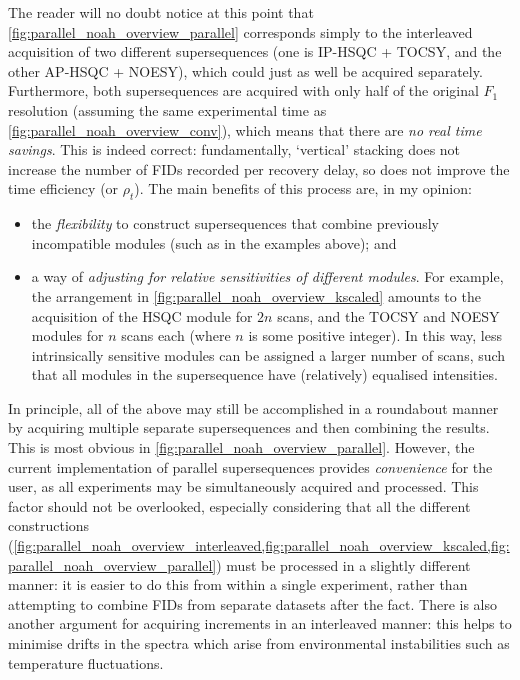 The reader will no doubt notice at this point that \cref{fig:parallel_noah_overview_parallel} corresponds simply to the interleaved acquisition of two different supersequences (one is IP-HSQC + TOCSY, and the other AP-HSQC + NOESY), which could just as well be acquired separately.
Furthermore, both supersequences are acquired with only half of the original $F_1$ resolution (assuming the same experimental time as \cref{fig:parallel_noah_overview_conv}), which means that there are \textit{no real time savings}.
This is indeed correct: fundamentally, `vertical' stacking does not increase the number of FIDs recorded per recovery delay, so does not improve the time efficiency (or $\rho_t$).
The main benefits of this process are, in my opinion:
\begin{itemize}
    \item the \textit{flexibility} to construct supersequences that combine previously incompatible modules (such as in the examples above); and
    \item a way of \textit{adjusting for relative sensitivities of different modules}.
        For example, the arrangement in \cref{fig:parallel_noah_overview_kscaled} amounts to the acquisition of the HSQC module for $2n$ scans, and the TOCSY and NOESY modules for $n$ scans each (where $n$ is some positive integer).
        In this way, less intrinsically sensitive modules can be assigned a larger number of scans, such that all modules in the supersequence have (relatively) equalised intensities.
\end{itemize}

In principle, all of the above may still be accomplished in a roundabout manner by acquiring multiple separate supersequences and then combining the results.
This is most obvious in \cref{fig:parallel_noah_overview_parallel}.
However, the current implementation of parallel supersequences provides \textit{convenience} for the user, as all experiments may be simultaneously acquired and processed.
This factor should not be overlooked, especially considering that all the different constructions (\cref{fig:parallel_noah_overview_interleaved,fig:parallel_noah_overview_kscaled,fig:parallel_noah_overview_parallel}) must be processed in a slightly different manner: it is easier to do this from within a single experiment, rather than attempting to combine FIDs from separate datasets after the fact.
There is also another argument for acquiring increments in an interleaved manner: this helps to minimise drifts in the spectra which arise from environmental instabilities such as temperature fluctuations.

